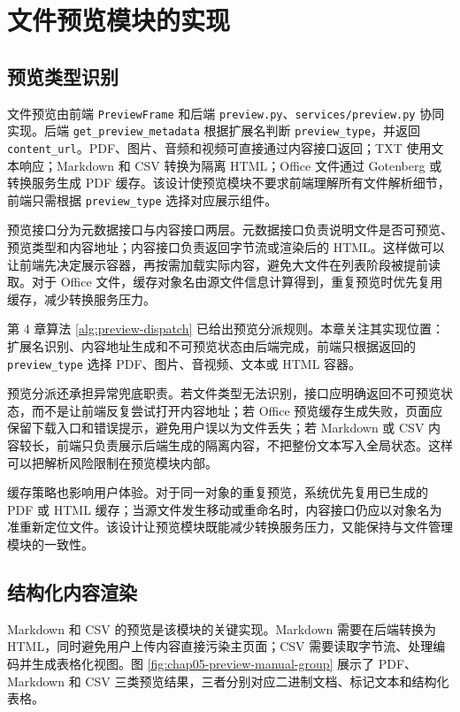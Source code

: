\section{文件预览模块的实现}

\subsection{预览类型识别}

文件预览由前端 \texttt{PreviewFrame} 和后端 \texttt{preview.py}、\texttt{services/preview.py} 协同实现。后端 \texttt{get\_preview\_metadata} 根据扩展名判断 \texttt{preview\_type}，并返回 \texttt{content\_url}。PDF、图片、音频和视频可直接通过内容接口返回；TXT 使用文本响应；Markdown 和 CSV 转换为隔离 HTML；Office 文件通过 Gotenberg 或转换服务生成 PDF 缓存。该设计使预览模块不要求前端理解所有文件解析细节，前端只需根据 \texttt{preview\_type} 选择对应展示组件。

预览接口分为元数据接口与内容接口两层。元数据接口负责说明文件是否可预览、预览类型和内容地址；内容接口负责返回字节流或渲染后的 HTML。这样做可以让前端先决定展示容器，再按需加载实际内容，避免大文件在列表阶段被提前读取。对于 Office 文件，缓存对象名由源文件信息计算得到，重复预览时优先复用缓存，减少转换服务压力。

第 4 章算法 \ref{alg:preview-dispatch} 已给出预览分派规则。本章关注其实现位置：扩展名识别、内容地址生成和不可预览状态由后端完成，前端只根据返回的 \texttt{preview\_type} 选择 PDF、图片、音视频、文本或 HTML 容器。

预览分派还承担异常兜底职责。若文件类型无法识别，接口应明确返回不可预览状态，而不是让前端反复尝试打开内容地址；若 Office 预览缓存生成失败，页面应保留下载入口和错误提示，避免用户误以为文件丢失；若 Markdown 或 CSV 内容较长，前端只负责展示后端生成的隔离内容，不把整份文本写入全局状态。这样可以把解析风险限制在预览模块内部。

缓存策略也影响用户体验。对于同一对象的重复预览，系统优先复用已生成的 PDF 或 HTML 缓存；当源文件发生移动或重命名时，内容接口仍应以对象名为准重新定位文件。该设计让预览模块既能减少转换服务压力，又能保持与文件管理模块的一致性。

\subsection{结构化内容渲染}

Markdown 和 CSV 的预览是该模块的关键实现。Markdown 需要在后端转换为 HTML，同时避免用户上传内容直接污染主页面；CSV 需要读取字节流、处理编码并生成表格化视图。图 \ref{fig:chap05-preview-manual-group} 展示了 PDF、Markdown 和 CSV 三类预览结果，三者分别对应二进制文档、标记文本和结构化表格。

